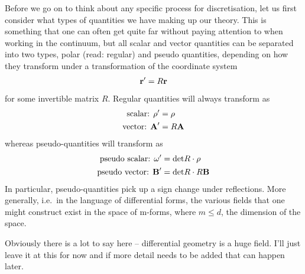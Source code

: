 \documentclass[11pt, oneside]{article} %
\numberwithin{equation}{section}
\begin{document}
Before we go on to think about any specific process for discretisation, let us first consider what types of quantities we have making up our theory. This is something that one can often get quite far without paying attention to when working in the continuum, but all scalar and vector quantities can be separated into two types, polar (read: regular) and pseudo quantities, depending on how they transform under a transformation of the coordinate system
\begin{align}
    \textbf r' = R\textbf r
\end{align}
for some invertible matrix $R$. Regular quantities will always transform as
\begin{align}
    \textup{scalar: }\rho' &= \rho \\ 
    \textup{vector: } \textbf A' &=R \textbf  A
\end{align}
whereas pseudo-quantities will transform as
\begin{align}
    \textup{pseudo scalar: }\omega' &= \textup{det}R \cdot \rho \\ 
    \textup{pseudo vector: } \textbf B' &=\textup{det}R \cdot R\textbf  B
\end{align}
In particular, pseudo-quantities pick up a sign change under reflections. More generally, i.e.~in the language of differential forms, the various fields that one might construct exist in the space of m-forms, where $m \leq d$, the dimension of the space. 
\begin{shaded}
    Obviously there is a lot to say here -- differential geometry is a huge field. I'll just leave it at this for now and if more detail needs to be added that can happen later.
\end{shaded}
\end{document}
